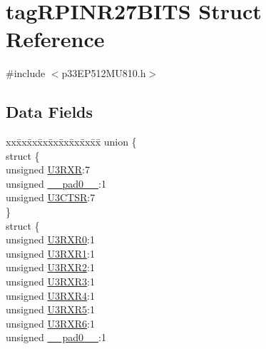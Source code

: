 \hypertarget{structtag_r_p_i_n_r27_b_i_t_s}{}\section{tag\+R\+P\+I\+N\+R27\+B\+I\+TS Struct Reference}
\label{structtag_r_p_i_n_r27_b_i_t_s}


{\ttfamily \#include $<$p33\+E\+P512\+M\+U810.\+h$>$}

\subsection*{Data Fields}
\begin{DoxyCompactItemize}
\item 
\begin{tabbing}
xx\=xx\=xx\=xx\=xx\=xx\=xx\=xx\=xx\=\kill
union \{\\
\>struct \{\\
\>\>unsigned \hyperlink{structtag_r_p_i_n_r27_b_i_t_s_acca30f376090587f2b7e9a0b60478fe2}{U3RXR}:7\\
\>\>unsigned \hyperlink{structtag_r_p_i_n_r27_b_i_t_s_adf71f3d8410c1f1dbbc96680a92c49af}{\_\_pad0\_\_}:1\\
\>\>unsigned \hyperlink{structtag_r_p_i_n_r27_b_i_t_s_a887f4446a49d519372e077e1197177aa}{U3CTSR}:7\\
\>\} \\
\>struct \{\\
\>\>unsigned \hyperlink{structtag_r_p_i_n_r27_b_i_t_s_ac3ed8865530c92561e650d0979157c04}{U3RXR0}:1\\
\>\>unsigned \hyperlink{structtag_r_p_i_n_r27_b_i_t_s_a0f0f4e219924b387f0a4f6801cb0d7e0}{U3RXR1}:1\\
\>\>unsigned \hyperlink{structtag_r_p_i_n_r27_b_i_t_s_a16b64aa53d147f7220bf9aa44c1cb017}{U3RXR2}:1\\
\>\>unsigned \hyperlink{structtag_r_p_i_n_r27_b_i_t_s_aa738215493bfe15479c9525171506eb5}{U3RXR3}:1\\
\>\>unsigned \hyperlink{structtag_r_p_i_n_r27_b_i_t_s_a105b182d938a7816d34bc944a3517fb7}{U3RXR4}:1\\
\>\>unsigned \hyperlink{structtag_r_p_i_n_r27_b_i_t_s_a71a8b2e52b38c0486ec6d0c5b05e8389}{U3RXR5}:1\\
\>\>unsigned \hyperlink{structtag_r_p_i_n_r27_b_i_t_s_ae82133520034a2ece85501ecb628967b}{U3RXR6}:1\\
\>\>unsigned \hyperlink{structtag_r_p_i_n_r27_b_i_t_s_adf71f3d8410c1f1dbbc96680a92c49af}{\_\_pad0\_\_}:1\\

\end{tabbing}
\end{DoxyCompactItemize}
